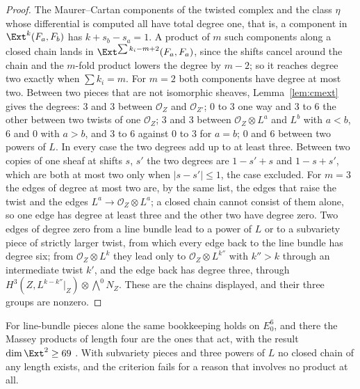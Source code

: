 \begin{proof}
The Maurer--Cartan components of the twisted complex and the class $\eta$ whose differential is computed all have total degree one, that is, a component in $\Ext^{k}(F_{a},F_{b})$ has $k+s_{b}-s_{a}=1$. A product of $m$ such components along a closed chain lands in $\Ext^{\sum k_{i}-m+2}(F_{a},F_{a})$, since the shifts cancel around the chain and the $m$-fold product lowers the degree by $m-2$; so it reaches degree two exactly when $\sum k_{i}=m$. For $m=2$ both components have degree at most two. Between two pieces that are not isomorphic sheaves, Lemma~\ref{lem:cmext} gives the degrees: $3$ and $3$ between $\mathcal{O}_{Z}$ and $\mathcal{O}_{Z'}$; $0$ to $3$ one way and $3$ to $6$ the other between two twists of one $\mathcal{O}_{Z}$; $3$ and $3$ between $\mathcal{O}_{Z}\otimes L^{a}$ and $L^{b}$ with $a<b$, $6$ and $0$ with $a>b$, and $3$ to $6$ against $0$ to $3$ for $a=b$; $0$ and $6$ between two powers of $L$. In every case the two degrees add up to at least three. Between two copies of one sheaf at shifts $s$, $s'$ the two degrees are $1-s'+s$ and $1-s+s'$, which are both at most two only when $|s-s'|\le1$, the case excluded. For $m=3$ the edges of degree at most two are, by the same list, the edges that raise the twist and the edges $L^{a}\to\mathcal{O}_{Z}\otimes L^{a}$; a closed chain cannot consist of them alone, so one edge has degree at least three and the other two have degree zero. Two edges of degree zero from a line bundle lead to a power of $L$ or to a subvariety piece of strictly larger twist, from which every edge back to the line bundle has degree six; from $\mathcal{O}_{Z}\otimes L^{k}$ they lead only to $\mathcal{O}_{Z}\otimes L^{k''}$ with $k''>k$ through an intermediate twist $k'$, and the edge back has degree three, through $H^{3}(Z,L^{k-k''}|_{Z})\otimes\bigwedge^{0}N_{Z}$. These are the chains displayed, and their three groups are nonzero.

\end{proof}

For line-bundle pieces alone the same bookkeeping holds on $E_{0}^{6}$, and there the Massey products of length four are the ones that act, with the result $\dim\Ext^{2}\ge69$ \cite[Thm.~18.35]{BMB26}. With subvariety pieces and three powers of $L$ no closed chain of any length exists, and the criterion fails for a reason that involves no product at all.

